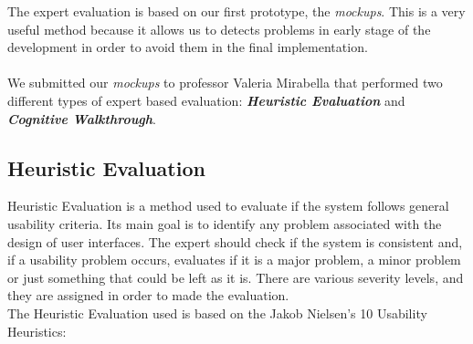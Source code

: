 \documentclass[12pt, a4paper]{article}
\numberwithin{figure}{section}
\begin{document}
The expert evaluation is based on our first prototype, the \textit{mockups}. This is a very useful method because
it allows us to detects problems in early stage of the development in order to avoid them in the final implementation.\\\\
We submitted our \textit{mockups} to professor Valeria Mirabella that performed two different types of expert based evaluation: 
\textbf{\textit{Heuristic Evaluation}} and \textbf{\textit{Cognitive Walkthrough}}.

\subsection{Heuristic Evaluation}

Heuristic Evaluation is a method used to evaluate if the system follows general usability criteria. Its main goal is to identify any problem associated with the design of user interfaces.
The expert should check if the system is consistent and, if a usability problem occurs, evaluates if it is a major problem,
a minor problem or just something that could be left as it is. 
There are various severity levels, and they are assigned in order to made the evaluation.\\
The Heuristic Evaluation used is based on the Jakob Nielsen’s 10 Usability Heuristics:
\end{document}
